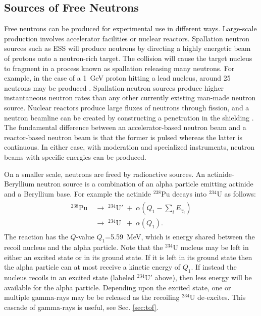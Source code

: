 \documentclass[main.tex]{subfiles}
\begin{document}
\subsection{Sources of Free Neutrons} \label{sec:freeNeutrons}
Free neutrons can be produced for experimental use in different ways. Large-scale production involves accelerator facilities or nuclear reactors. Spallation neutron sources such as ESS will produce neutrons by directing a highly energetic beam of protons onto a neutron-rich target. The collision will cause the target nucleus to fragment in a process known as spallation releasing many neutrons. 
For example, in the case of a \SI{1}{\GeV} proton hitting a lead nucleus, around 25 neutrons may be produced \cite{Tavernier}. Spallation neutron sources produce higher instantaneous neutron rates than any other currently existing man-made neutron source.
Nuclear reactors produce large fluxes of neutrons through fission, and a neutron beamline can be created by constructing a penetration in the shielding  \cite{Krane}. The fundamental difference between an accelerator-based neutron beam and a reactor-based neutron beam is that the former is pulsed whereas the latter is continuous. In either case, with moderation and specialized instruments, neutron beams with specific energies can be produced.

On a smaller scale, neutrons are freed by radioactive sources. An actinide-Beryllium neutron source is a combination of an alpha particle emitting actinide and a Beryllium base. For example the actinide $^{238}$Pu decays into $^{234}$U as follows:
\begin{align}
	\begin{split}	
		^\textrm{238}\textrm{Pu}\;&\rightarrow\;^{\textrm{234}}\textrm{U}'\;+\;\alpha\left(Q_1-\textstyle\sum_i E_{\gamma_i}\right)\\
		&\rightarrow\;^{\textrm{234}}\textrm{U}\;\;+\;\alpha(Q_1).
	\label{eq:actinide}
	\end{split}
\end{align}
The reaction has the $Q$-value $Q_1$=\SI{5.59}{\MeV}, which is energy shared between the recoil nucleus and the alpha particle. Note that the $^\textrm{234}$U nucleus may be left in either an excited state or in its ground state. If it is left in its ground state then the alpha particle can at most receive a kinetic energy of $Q_1$. If instead the nucleus recoils in an excited state (labeled $^\textrm{234}$U$'$ above), then less energy will be available for the alpha particle.
Depending upon the excited state, one or multiple gamma-rays may be be released as the recoiling $^\textrm{234}$U de-excites. This cascade of gamma-rays is useful, see Sec. \ref{sec:tof}.
\end{document}
